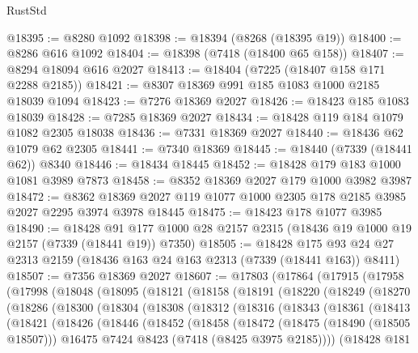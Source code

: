 \begin{lexlean}{RustStd}
\begin{coremodule}
@18395 := @8280 @1092
@18398 := @18394 (@8268 (@18395 @19))
@18400 := @8286 @616 @1092
@18404 := @18398 (@7418 (@18400 @65 @158))
@18407 := @8294 @18094 @616 @2027
@18413 := @18404 (@7225 (@18407 @158 @171 @2288 @2185))
@18421 := @8307 @18369 @991 @185 @1083 @1000 @2185 @18039 @1094
@18423 := @7276 @18369 @2027
@18426 := @18423 @185 @1083 @18039
@18428 := @7285 @18369 @2027
@18434 := @18428 @119 @184 @1079 @1082 @2305 @18038
@18436 := @7331 @18369 @2027
@18440 := @18436 @62 @1079 @62 @2305
@18441 := @7340 @18369
@18445 := @18440 (@7339 (@18441 @62)) @8340
@18446 := @18434 @18445
@18452 := @18428 @179 @183 @1000 @1081 @3989 @7873
@18458 := @8352 @18369 @2027 @179 @1000 @3982 @3987
@18472 := @8362 @18369 @2027 @119 @1077 @1000 @2305 @178 @2185 @3985 @2027 @2295 @3974 @3978 @18445
@18475 := @18423 @178 @1077 @3985
@18490 := @18428
    @91
    @177
    @1000
    @28
    @2157
    @2315
    (@18436 @19 @1000 @19 @2157 (@7339 (@18441 @19)) @7350)
@18505 := @18428
    @175
    @93
    @24
    @27
    @2313
    @2159
    (@18436 @163 @24 @163 @2313 (@7339 (@18441 @163)) @8411)
@18507 := @7356 @18369 @2027
@18607 := @17803
    (@17864
      (@17915
        (@17958
          (@17998
            (@18048
              (@18095
                (@18121
                  (@18158
                    (@18191
                      (@18220
                        (@18249
                          (@18270
                            (@18286
                              (@18300
                                (@18304
                                  (@18308
                                    (@18312
                                      (@18316
                                        (@18343
                                          (@18361
                                            (@18413
                                              (@18421
                                                (@18426
                                                  (@18446
                                                    (@18452
                                                      (@18458
                                                        (@18472
                                                          (@18475 (@18490 (@18505 @18507)))
                                                          @16475
                                                          @7424
                                                          @8423
                                                          (@7418 (@8425 @3975 @2185))))
                                                      (@18428
                                                        @181

\end{coremodule}
\end{lexlean}
